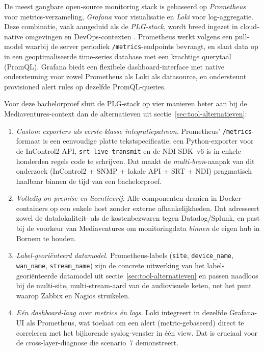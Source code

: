 De meest gangbare open-source monitoring stack is gebaseerd op \emph{Prometheus} voor metrics-verzameling, \emph{Grafana} voor visualisatie en \emph{Loki} voor log-aggregatie. Deze combinatie, vaak aangeduid als de \emph{PLG-stack}, wordt breed ingezet in cloud-native omgevingen en DevOps-contexten \autocite{Turnbull2018}. Prometheus werkt volgens een pull-model waarbij de server periodiek \texttt{/metrics}-endpoints bevraagt, en slaat data op in een geoptimaliseerde time-series database met een krachtige querytaal (PromQL). Grafana biedt een flexibele dashboard-interface met native ondersteuning voor zowel Prometheus als Loki als datasource, en ondersteunt provisioned alert rules op dezelfde PromQL-queries.

Voor deze bachelorproef sluit de PLG-stack op vier manieren beter aan bij de Mediaventures-context dan de alternatieven uit sectie~\ref{sec:tool-alternatieven}:

\begin{enumerate}
  \item \emph{Custom exporters als eerste-klasse integratiepatroon.} Prometheus' \texttt{/metrics}-formaat is een eenvoudige platte tekstspecificatie; een Python-exporter voor de InControl2-API, \texttt{srt-live-transmit} en de NDI SDK~v6 is in enkele honderden regels code te schrijven. Dat maakt de \emph{multi-bron}-aanpak van dit onderzoek (InControl2 + SNMP + lokale API + SRT + NDI) pragmatisch haalbaar binnen de tijd van een bachelorproef.
  \item \emph{Volledig on-premise en licentievrij.} Alle componenten draaien in Docker-containers op een enkele host zonder externe afhankelijkheden. Dat adresseert zowel de datalokaliteit- als de kostenbezwaren tegen Datadog/Splunk, en past bij de voorkeur van Mediaventures om monitoringdata \emph{binnen} de eigen hub in Bornem te houden.
  \item \emph{Label-georiënteerd datamodel.} Prometheus-labels (\texttt{site}, \texttt{device\_name}, \texttt{wan\_name}, \texttt{stream\_name}) zijn de concrete uitwerking van het label-georiënteerde datamodel uit sectie~\ref{sec:tool-alternatieven} en passen naadloos bij de multi-site, multi-stream-aard van de audiovisuele keten, net het punt waarop Zabbix en Nagios struikelen.
  \item \emph{Eén dashboard-laag over metrics én logs.} Loki integreert in dezelfde Grafana-UI als Prometheus, wat toelaat om een alert (metric-gebaseerd) direct te correleren met het bijhorende syslog-venster in één view. Dat is cruciaal voor de cross-layer-diagnose die scenario~7 demonstreert.
\end{enumerate}

